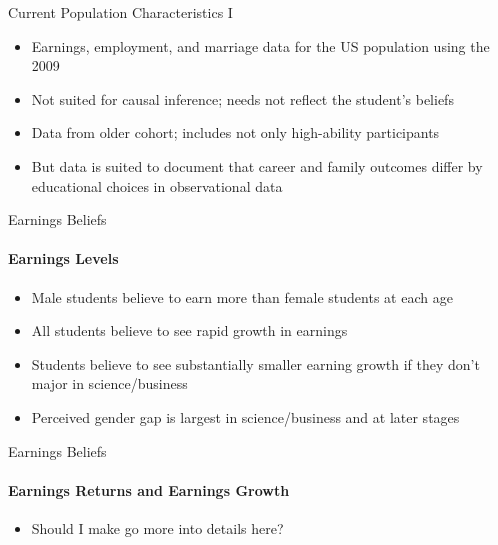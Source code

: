 \documentclass[12pt]{beamer}
\begin{document}

\begin{frame}{Current Population Characteristics I}
    \begin{itemize}
        \item Earnings, employment, and marriage data for the US population using the 2009
        \item Not suited for causal inference; needs not reflect the student's beliefs
        \item Data from older cohort; includes not only high-ability participants
        \item But data is suited to document that career and family outcomes differ by educational choices in observational data
    \end{itemize}
\end{frame}




\begin{frame}{Earnings Beliefs}
    \framesubtitle{Earnings Levels} 
    \begin{itemize}
        \item Male students believe to earn more than female students at each age
        \item All students believe to see rapid growth in earnings
        \item Students believe to see substantially smaller earning growth if they don't major in science/business
        \item Perceived gender gap is largest in science/business and at later stages
    \end{itemize}
\end{frame}

\begin{frame}{Earnings Beliefs}
    \framesubtitle{Earnings Returns and Earnings Growth} 
    \begin{itemize}
        \item Should I make go more into details here?
    \end{itemize}
\end{frame}
\end{document}
